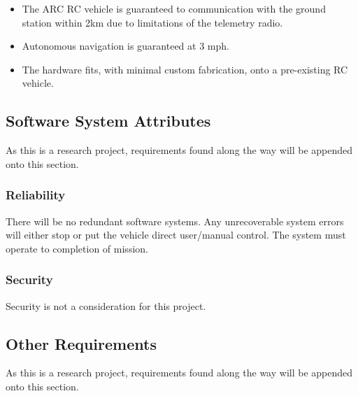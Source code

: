 \documentclass[compsoc,draftclsnofoot,onecolumn,10pt]{IEEEtran}
\begin{document}
\begin{itemize}
	\item The ARC RC vehicle is guaranteed to communication with the ground station within 2km due to limitations of the telemetry radio.
	\item Autonomous navigation is guaranteed at 3 mph.
	\item The hardware fits, with minimal custom fabrication, onto a pre-existing RC vehicle.
\end{itemize}

\subsection{Software System Attributes}
As this is a research project, requirements found along the way will be appended onto this section. 

\subsubsection{Reliability}
There will be no redundant software systems. 
Any unrecoverable system errors will either stop or put the vehicle direct user/manual control.
The system must operate to completion of mission.

\subsubsection{Security}
Security is not a consideration for this project. 

\subsection{Other Requirements}
As this is a research project, requirements found along the way will be appended onto this section. 

\end{document}
